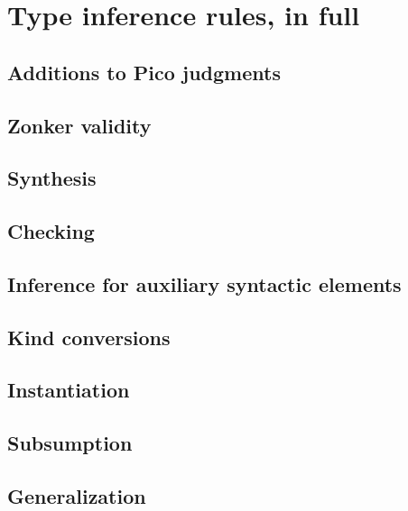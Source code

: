 \chapter{Type inference rules, in full}
\label{app:inference-rules}

\renewcommand{\ottusedrule}[1]{\[#1\]\\[-1ex]}

\section{Additions to Pico judgments}

\ottdefnUTy{}
\ottdefnUCo{}
\ottdefnUCtx{}
\ottdefnUV{}

\section{Zonker validity}

\ottdefnZonk{}

\section{Synthesis}

\ottdefnIITy{}
\ottdefnIITyS{}

\section{Checking}

\ottdefnIITyDown{}
\ottdefnIITyDownS{}
\ottdefnIITyDownPoly{}

\section{Inference for auxiliary syntactic elements}

\ottdefnIIArg{}
\ottdefnIIAlt{}
\ottdefnIIAltC{}
\ottdefnIIQVar{}
\ottdefnIIAQVar{}
\ottdefnIIAQVarC{}
\ottdefnIIQuant{}

\section{Kind conversions}

\ottdefnIIFun{}
\ottdefnIIScrut{}

\section{Instantiation}

\ottdefnIIInst{}
\ottdefnIVisLT{}

\section{Subsumption}

\ottdefnIIPrenex{}
\ottdefnIISubTwo{}
\ottdefnIISub{}

\section{Generalization}

\ottdefnIIGen{}

